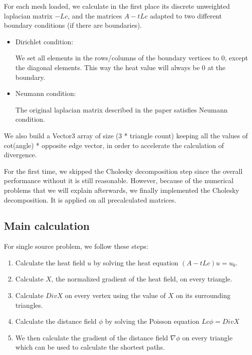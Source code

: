 \documentclass[a4paper,12pt,twoside]{article}
\begin{document}
For each mesh loaded, we calculate in the first place its discrete unweighted laplacian matrix $-Lc$, and the matrices $A-tLc$ adapted to two different boundary conditions (if there are boundaries).

\begin{itemize}
\item
Dirichlet condition:

We set all elements in the rows/columns of the boundary vertices to 0, except the diagonal elements. This way the heat value will always be 0 at the boundary.

\item
Neumann condition:

The original laplacian matrix described in the paper satisfies Neumann condition.
\end{itemize}


We also build a Vector3 array of size (3 * triangle count) keeping all the values of cot(angle) * opposite edge vector, in order to accelerate the calculation of divergence.

For the first time, we skipped the Cholesky decomposition step since the overall performance without it is still reasonable. However, because of the numerical problems that we will explain afterwards, we finally implemented the Cholesky decomposition. It is applied on all precalculated matrices.

\subsection{Main calculation}

For single source problem, we follow these steps:

\begin{enumerate}
\item
Calculate the heat field $u$ by solving the heat equation $(A-tLc)u = u_0$.
\item
Calculate $X$, the normalized gradient of the heat field, on every triangle.
\item
Calculate $DivX$ on every vertex using the value of $X$ on its surrounding triangles.
\item
Calculate the distance field $\phi$ by solving the Poisson equation $Lc \phi = DivX$
\item
We then calculate the gradient of the distance field $\nabla \phi$ on every triangle which can be used to calculate the shortest paths.
\end{enumerate}
\end{document}
